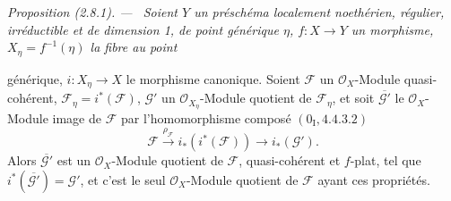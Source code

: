 \documentclass[10pt,oneside]{book}
\newcommand{\oldpage}[2][]{%
  \setcounter{footnote}{0}%
  \marginpar{\scriptsize\textbf{#1}~|~#2}\ignorespaces}
\newenvironment{proposition}[1][]{%
  \par\medskip\noindent\itshape Proposition (#1). ---\ }{\par}
\begin{document}
\begin{proposition}[2.8.1]
\label{IV.2.8.1-fr}
Soient $Y$ un préschéma localement noethérien, régulier, irréductible et de
dimension 1, de point générique $\eta$, $f:X\to Y$ un morphisme,
$X_\eta=f^{-1}(\eta)$ la fibre au point

\oldpage[IV-2]{34}
générique, $i:X_\eta\to X$ le morphisme canonique. Soient $\mathcal F$ un
$\mathcal O_X$-Module quasi-cohérent, $\mathcal F_\eta=i^*(\mathcal F)$,
$\mathcal G'$ un $\mathcal O_{X_\eta}$-Module quotient de $\mathcal F_\eta$,
et soit $\overline{\mathcal G'}$ le $\mathcal O_X$-Module image de $\mathcal F$
par l'homomorphisme composé $(0_{\mathrm I},4.4.3.2)$
\[
\mathcal F\xrightarrow{\rho_{\mathcal F}}i_*(i^*(\mathcal F))
\longrightarrow i_*(\mathcal G').
\]
Alors $\overline{\mathcal G'}$ est un $\mathcal O_X$-Module quotient de
$\mathcal F$, quasi-cohérent et $f$-plat, tel que
$i^*(\overline{\mathcal G'})=\mathcal G'$, et c'est le seul
$\mathcal O_X$-Module quotient de $\mathcal F$ ayant ces propriétés.
\end{proposition}
\end{document}
